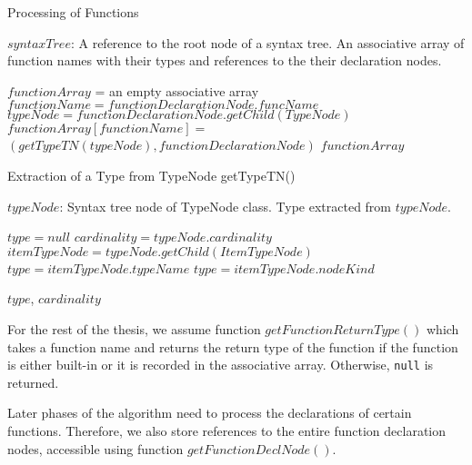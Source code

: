 \begin{algorithm}
\caption{Processing of Functions}
\label{ALG_processing_of_functions}
\begin{algorithmic}[1]
\REQUIRE $syntaxTree$: A reference to the root node of a syntax tree.
\ENSURE An associative array of function names with their types and references to the their declaration nodes.

\STATE $functionArray$ = an empty associative array
    \STATE $functionName = functionDeclarationNode.funcName$
    \STATE $typeNode = functionDeclarationNode.getChild(TypeNode)$
    \STATE $functionArray[functionName] =$ \\ $(getTypeTN(typeNode), functionDeclarationNode)$
\ENDFOR
\RETURN $functionArray$
\end{algorithmic}
\end{algorithm}

\begin{algorithm}
\caption{Extraction of a Type from TypeNode getTypeTN()}
\label{ALG_extraction_of_a_type_from_typenode}
\begin{algorithmic}[1]
\REQUIRE $typeNode$: Syntax tree node of TypeNode class.
\ENSURE Type extracted from $typeNode$.

\STATE $type = null$
\STATE $cardinality = typeNode.cardinality$
\STATE $itemTypeNode = typeNode.getChild(ItemTypeNode)$
    \STATE $type = itemTypeNode.typeName$
    \STATE $type = itemTypeNode.nodeKind$
\ENDIF

\RETURN $type$, $cardinality$
\end{algorithmic}
\end{algorithm}


For the rest of the thesis, we assume function $getFunctionReturnType()$ which takes a function name and returns the return type of the function if the function is either built-in or it is recorded in the associative array. Otherwise, \texttt{null} is returned.

Later phases of the algorithm need to process the declarations of certain functions. Therefore, we also store references to the entire function declaration nodes, accessible using function $getFunctionDeclNode()$.

